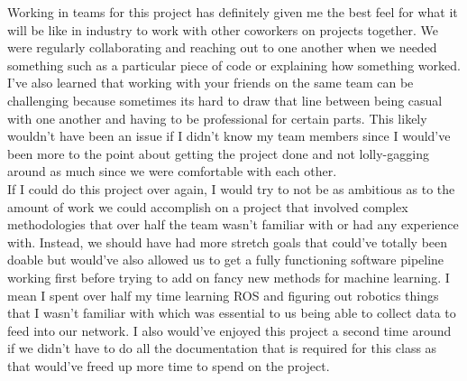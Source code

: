 \documentclass[draftclsnofoot, onecolumn, 10pt, compsoc]{IEEEtran}
\begin{document}
Working in teams for this project has definitely given me the best feel for what it will be like in industry to work with other coworkers on projects together. We were regularly collaborating and reaching out to one another when we needed something such as a particular piece of code or explaining how something worked. I've also learned that working with your friends on the same team can be challenging because sometimes its hard to draw that line between being casual with one another and having to be professional for certain parts. This likely wouldn't have been an issue if I didn't know my team members since I would've been more to the point about getting the project done and not lolly-gagging around as much since we were comfortable with each other. \\
If I could do this project over again, I would try to not be as ambitious as to the amount of work we could accomplish on a project that involved complex methodologies that over half the team wasn't familiar with or had any experience with. Instead, we should have had more stretch goals that could've totally been doable but would've also allowed us to get a fully functioning software pipeline working first before trying to add on fancy new methods for machine learning. I mean I spent over half my time learning ROS and figuring out robotics things that I wasn't familiar with which was essential to us being able to collect data to feed into our network. I also would've enjoyed this project a second time around if we didn't have to do all the documentation that is required for this class as that would've freed up more time to spend on the project.
\end{document}
